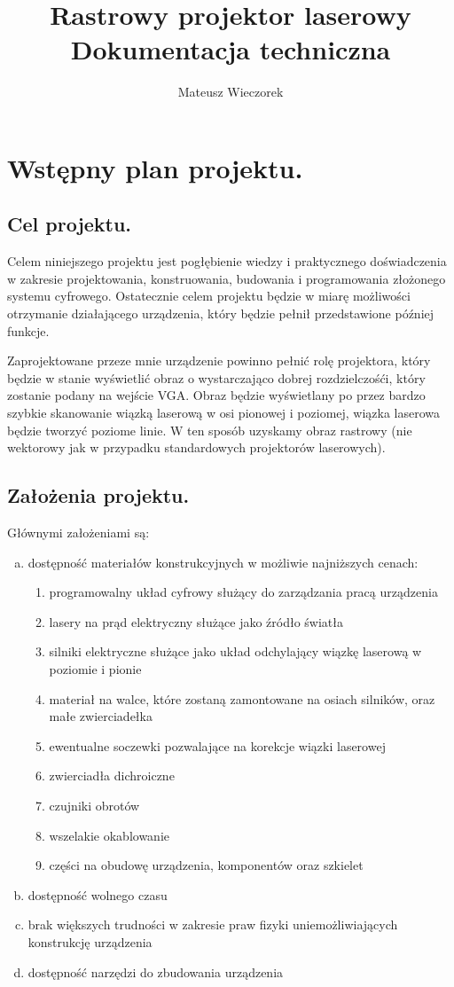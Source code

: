 \documentclass[a4paper,oneside,11pt]{report}
\author{Mateusz Wieczorek}
\title{Rastrowy projektor laserowy\\
Dokumentacja techniczna}
\begin{document}
\sloppy
\maketitle
\tableofcontents
\newpage
\section{Wstępny plan projektu.}
\subsection{Cel projektu.}
Celem niniejszego projektu jest pogłębienie wiedzy i praktycznego doświadczenia w zakresie projektowania, konstruowania, budowania i programowania złożonego systemu cyfrowego. Ostatecznie celem projektu będzie w miarę możliwości otrzymanie działającego urządzenia, który będzie pełnił przedstawione później funkcje.

Zaprojektowane przeze mnie urządzenie powinno pełnić rolę projektora, który będzie w stanie wyświetlić obraz o wystarczająco dobrej rozdzielczośći, który zostanie podany na wejście VGA. Obraz będzie wyświetlany po przez bardzo szybkie skanowanie wiązką laserową w osi pionowej i poziomej, wiązka laserowa będzie tworzyć poziome linie. W ten sposób uzyskamy obraz rastrowy (nie wektorowy jak w przypadku standardowych projektorów laserowych).
\subsection{Założenia projektu.}
Głównymi założeniami są:
\begin{enumerate}[a)]
\item dostępność materiałów konstrukcyjnych w możliwie najniższych cenach:
\begin{enumerate}[-]
\item programowalny układ cyfrowy służący do zarządzania pracą urządzenia
\item lasery na prąd elektryczny służące jako źródło światła
\item silniki elektryczne służące jako układ odchylający wiązkę laserową w poziomie i pionie
\item materiał na walce, które zostaną zamontowane na osiach silników, oraz małe zwierciadełka
\item ewentualne soczewki pozwalające na korekcje wiązki laserowej
\item zwierciadła dichroiczne
\item czujniki obrotów
\item wszelakie okablowanie
\item części na obudowę urządzenia, komponentów oraz szkielet
\end{enumerate}
\item dostępność wolnego czasu
\item brak większych trudności w zakresie praw fizyki uniemożliwiających konstrukcję urządzenia
\item dostępność narzędzi do zbudowania urządzenia
\end{enumerate}
\end{document}
